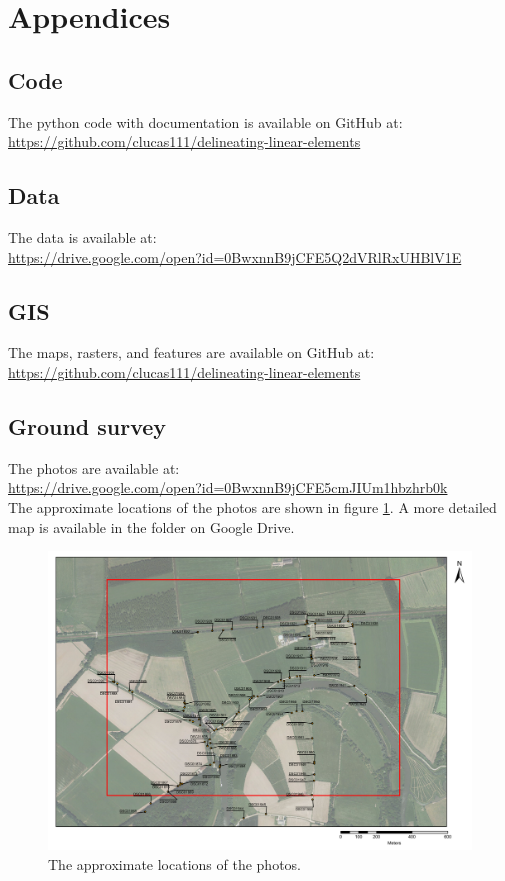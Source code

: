 \section{Appendices}
\subsection{Code}
The python code with documentation is available on GitHub at:\\ \url{https://github.com/clucas111/delineating-linear-elements}

\subsection{Data}
The data is available at:\\
\url{https://drive.google.com/open?id=0BwxnnB9jCFE5Q2dVRlRxUHBlV1E}

\subsection{GIS}
The maps, rasters, and features are available on GitHub at:\\
\url{https://github.com/clucas111/delineating-linear-elements}

\subsection{Ground survey}
The photos are available at:\\
\url{https://drive.google.com/open?id=0BwxnnB9jCFE5cmJIUm1hbzhrb0k}
\\
The approximate locations of the photos are shown in figure \ref{fig:photolocs}. A more detailed map is available in the folder on Google Drive.

\begin{figure}
	\centering
	\includegraphics[scale=0.45]{./img/PhotoLocations}
	\caption{The approximate locations of the photos.}
	\label{fig:photolocs}
\end{figure}

